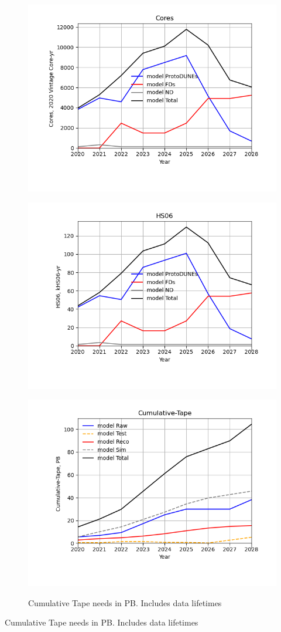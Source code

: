 \documentclass[12pt,landscape]{article}
\begin{document}
\begin{figure}[ht]
\centering\includegraphics[height=0.4\textwidth]{report/Parameters_2022-11-07-2028-Cores.png}\label{Cores}
\caption{}
\end{figure}
\begin{figure}[ht]
\centering\includegraphics[height=0.4\textwidth]{report/Parameters_2022-11-07-2028-HS06.png}\label{HS06}
\caption{}
\end{figure}
\begin{figure}[ht]
\centering\includegraphics[height=0.4\textwidth]{report/Parameters_2022-11-07-2028-Cumulative-Tape.png}\label{Cumulative-Tape}
\caption{Cumulative Tape needs in PB. Includes data lifetimes}
\end{figure}
\begin{table}[h]
\centering{}\label{Cumulative-Tape
}
\caption{Cumulative Tape needs in PB. Includes data lifetimes}
\end{table}
\end{document}
